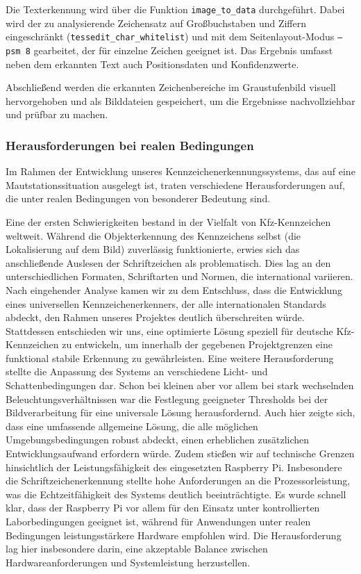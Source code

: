 Die Texterkennung wird über die Funktion \texttt{image\_to\_data} durchgeführt. Dabei wird der zu analysierende Zeichensatz auf Großbuchstaben und Ziffern eingeschränkt (\texttt{tessedit\_char\_whitelist}) und mit dem Seitenlayout-Modus \texttt{--psm 8} gearbeitet, der für einzelne Zeichen geeignet ist. Das Ergebnis umfasst neben dem erkannten Text auch Positionsdaten und Konfidenzwerte.\singlespacing

Abschließend werden die erkannten Zeichenbereiche im Graustufenbild visuell hervorgehoben und als Bilddateien gespeichert, um die Ergebnisse nachvollziehbar und prüfbar zu machen. \cite{geeksforgeeks2021tesseract}

\subsubsection{Herausforderungen bei realen Bedingungen}
Im Rahmen der Entwicklung unseres Kennzeichenerkennungssystems, das auf eine Mautstationssituation ausgelegt ist, traten verschiedene Herausforderungen auf, die unter realen Bedingungen von besonderer Bedeutung sind. \singlespacing

Eine der ersten Schwierigkeiten bestand in der Vielfalt von Kfz-Kennzeichen weltweit. 
Während die Objekterkennung des Kennzeichens selbst (die Lokalisierung auf dem Bild) zuverlässig funktionierte, erwies sich das anschließende Auslesen der Schriftzeichen als problematisch. 
 Dies lag an den unterschiedlichen Formaten, Schriftarten und Normen, die international variieren. 
 Nach eingehender Analyse kamen wir zu dem Entschluss, dass die Entwicklung eines universellen Kennzeichenerkenners, der alle internationalen Standards abdeckt, den Rahmen unseres Projektes deutlich überschreiten würde. 
 Stattdessen entschieden wir uns, eine optimierte Lösung speziell für deutsche Kfz-Kennzeichen zu entwickeln, um innerhalb der gegebenen Projektgrenzen eine funktional stabile Erkennung zu gewährleisten.\singlespacing
 Eine weitere Herausforderung stellte die Anpassung des Systems an verschiedene Licht- und Schattenbedingungen dar. 
 Schon bei kleinen aber vor allem bei stark wechselnden Beleuchtungsverhältnissen war die Festlegung geeigneter Thresholds bei der Bildverarbeitung für eine universale Lösung herausfordernd. 
 Auch hier zeigte sich, dass eine umfassende allgemeine Lösung, die alle möglichen Umgebungsbedingungen robust abdeckt, einen erheblichen zusätzlichen Entwicklungsaufwand erfordern würde. \singlespacing
 Zudem stießen wir auf technische Grenzen hinsichtlich der Leistungsfähigkeit des eingesetzten Raspberry Pi.
Insbesondere die Schriftzeichenerkennung stellte hohe Anforderungen an die Prozessorleistung, was die Echtzeitfähigkeit des Systems deutlich beeinträchtigte.
Es wurde schnell klar, dass der Raspberry Pi vor allem für den Einsatz unter kontrollierten Laborbedingungen geeignet ist, während für Anwendungen unter realen Bedingungen leistungsstärkere Hardware empfohlen wird.
Die Herausforderung lag hier insbesondere darin, eine akzeptable Balance zwischen Hardwareanforderungen und Systemleistung herzustellen.\singlespacing

